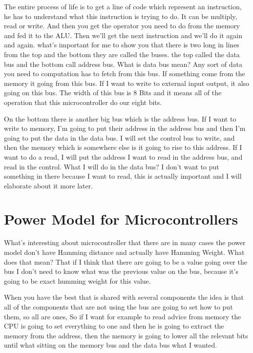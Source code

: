 The entire process of life is to get a line of code which represent an
instruction, he has to understand what this instruction is trying to do. It can
be multiply, read or write. And then you get the operator you need to do from
the memory and fed it to the ALU. Then we'll get the next instruction and we'll
do it again and again. what's important for me to show you that there is two
long in lines from the top and the bottom they are called the buses. the top
called the data bus and the bottom call address bus. What is data bus mean? Any
sort of data you need to computation has to fetch from this bus. If something
come from the memory it going from this bus. If I want to write to external
input output, it also going on this bus. The width of this bus is 8 Bits and it
means all of the operation that this microcontroller do our eight bits.

On the bottom there is another big bus which is the address bus. If I want to
write to memory, I'm going to put their address in the address bus and then I'm
going to put the data in the data bus. I will set the control bus to write, and
then the memory which is somewhere else is it going to rise to this address. If
I want to do a read, I will put the address I want to read in the address bus,
and read in the control. What I will do in the data bus? I don't want to put
something in there because I want to read, this is actually important and I will
elaborate about it more later.

\section{Power Model for Microcontrollers}
What's interesting about microcontroller that there are in many cases the power
model don't have Hamming distance and actually have Hamming Weight. What does
that mean? That if I think that there are going to be a value going over the bus
I don't need to know what was the previous value on the bus, because it's going
to be exact humming weight for this value. 

When you have the best that is shared with several components the idea is that
all of the components that are not using the bus are going to set how to put
them, so all are ones, So if I want for example to read advice from memory the
CPU is going to set everything to one and then he is going to extract the memory
from the address, then the memory is going to lower all the relevant bits until
what sitting on the memory bus and the data bus what I wanted. 

